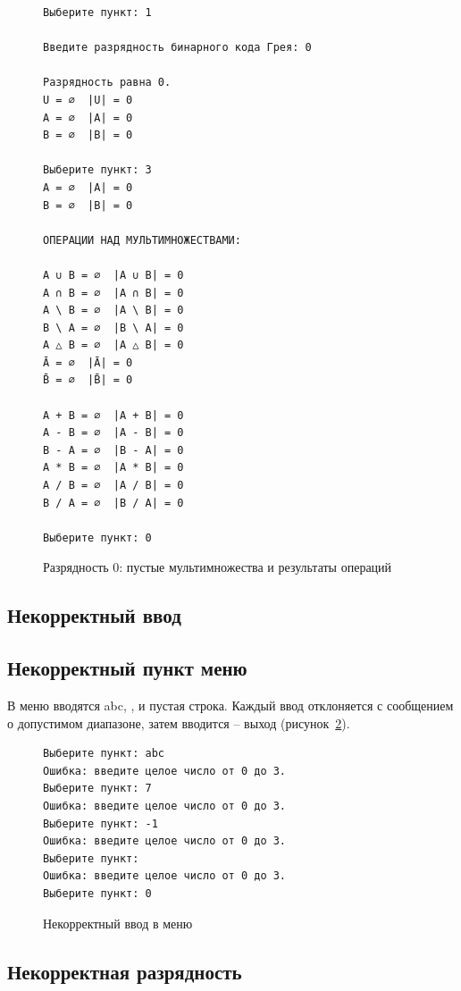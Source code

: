 \documentclass[14pt,a4paper]{extreport}
\newcommand{\code}[1]{{\ttfamily #1}}
\begin{document}
\begin{figure}[H]
\begin{lstlisting}[numbers=none,frame=single]
Выберите пункт: 1

Введите разрядность бинарного кода Грея: 0

Разрядность равна 0.
U = ∅  |U| = 0
A = ∅  |A| = 0
B = ∅  |B| = 0

Выберите пункт: 3
A = ∅  |A| = 0
B = ∅  |B| = 0

ОПЕРАЦИИ НАД МУЛЬТИМНОЖЕСТВАМИ:

A ∪ B = ∅  |A ∪ B| = 0
A ∩ B = ∅  |A ∩ B| = 0
A \ B = ∅  |A \ B| = 0
B \ A = ∅  |B \ A| = 0
A △ B = ∅  |A △ B| = 0
Ā = ∅  |Ā| = 0
B̄ = ∅  |B̄| = 0

A + B = ∅  |A + B| = 0
A - B = ∅  |A - B| = 0
B - A = ∅  |B - A| = 0
A * B = ∅  |A * B| = 0
A / B = ∅  |A / B| = 0
B / A = ∅  |B / A| = 0

Выберите пункт: 0
\end{lstlisting}
\caption{Разрядность 0: пустые мультимножества и результаты операций}\label{fig:bits0}
\end{figure}

\subsection*{Некорректный ввод}

\subsection{Некорректный пункт меню}

В меню вводятся \code{abc}, \code{7}, \code{-1} и пустая строка. Каждый ввод отклоняется с сообщением о допустимом диапазоне, затем вводится \code{0} -- выход (рисунок~\ref{fig:badmenu}).

\begin{figure}[H]
\begin{lstlisting}[numbers=none,frame=single]
Выберите пункт: abc
Ошибка: введите целое число от 0 до 3.
Выберите пункт: 7
Ошибка: введите целое число от 0 до 3.
Выберите пункт: -1
Ошибка: введите целое число от 0 до 3.
Выберите пункт: 
Ошибка: введите целое число от 0 до 3.
Выберите пункт: 0
\end{lstlisting}
\caption{Некорректный ввод в меню}\label{fig:badmenu}
\end{figure}

\subsection{Некорректная разрядность}
\end{document}
